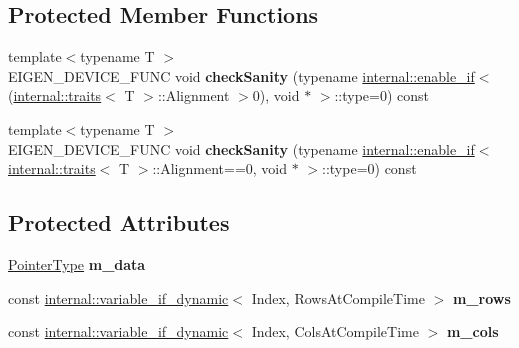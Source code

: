 \subsection*{Protected Member Functions}
\begin{DoxyCompactItemize}
\item 
\mbox{\label{class_eigen_1_1_map_base_3_01_derived_00_01_read_only_accessors_01_4_a4e0760a55ecdb14d06bf728da2e0fa87}} 
{\footnotesize template$<$typename T $>$ }\\E\+I\+G\+E\+N\+\_\+\+D\+E\+V\+I\+C\+E\+\_\+\+F\+U\+NC void {\bfseries check\+Sanity} (typename \mbox{\hyperlink{struct_eigen_1_1internal_1_1enable__if}{internal\+::enable\+\_\+if}}$<$(\mbox{\hyperlink{struct_eigen_1_1internal_1_1traits}{internal\+::traits}}$<$ T $>$\+::Alignment $>$0), void $\ast$ $>$\+::type=0) const
\item 
\mbox{\label{class_eigen_1_1_map_base_3_01_derived_00_01_read_only_accessors_01_4_af36c1238dff55477218d1e7996db8d5e}} 
{\footnotesize template$<$typename T $>$ }\\E\+I\+G\+E\+N\+\_\+\+D\+E\+V\+I\+C\+E\+\_\+\+F\+U\+NC void {\bfseries check\+Sanity} (typename \mbox{\hyperlink{struct_eigen_1_1internal_1_1enable__if}{internal\+::enable\+\_\+if}}$<$ \mbox{\hyperlink{struct_eigen_1_1internal_1_1traits}{internal\+::traits}}$<$ T $>$\+::Alignment==0, void $\ast$ $>$\+::type=0) const
\end{DoxyCompactItemize}
\subsection*{Protected Attributes}
\begin{DoxyCompactItemize}
\item 
\mbox{\label{class_eigen_1_1_map_base_3_01_derived_00_01_read_only_accessors_01_4_a95af5ee3b194ce499181e322161a7961}} 
\mbox{\hyperlink{struct_eigen_1_1internal_1_1true__type}{Pointer\+Type}} {\bfseries m\+\_\+data}
\item 
\mbox{\label{class_eigen_1_1_map_base_3_01_derived_00_01_read_only_accessors_01_4_ac3c4c3f0ddca9b6508409ebc0a2dd175}} 
const \mbox{\hyperlink{class_eigen_1_1internal_1_1variable__if__dynamic}{internal\+::variable\+\_\+if\+\_\+dynamic}}$<$ Index, Rows\+At\+Compile\+Time $>$ {\bfseries m\+\_\+rows}
\item 
\mbox{\label{class_eigen_1_1_map_base_3_01_derived_00_01_read_only_accessors_01_4_a868c3efca7dbbde7c80a8589b5435ca2}} 
const \mbox{\hyperlink{class_eigen_1_1internal_1_1variable__if__dynamic}{internal\+::variable\+\_\+if\+\_\+dynamic}}$<$ Index, Cols\+At\+Compile\+Time $>$ {\bfseries m\+\_\+cols}
\end{DoxyCompactItemize}


